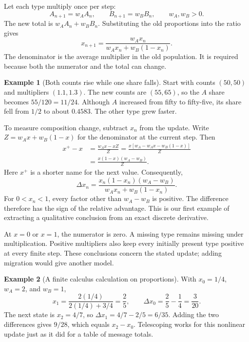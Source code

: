 \documentclass[11pt,oneside,openany]{book}
\theoremstyle{definition}
\newtheorem{example}{Example}[chapter]
\theoremstyle{remark}
\numberwithin{equation}{chapter}
\begin{document}
Let each type multiply once per step: \[A_{n+1}=w_AA_n,\qquad B_{n+1}=w_BB_n,\qquad w_A,w_B>0.\] The new total is \(w_AA_n+w_BB_n\). Substituting the old proportions into the ratio gives \[\boxed{x_{n+1}=\frac{w_Ax_n}{w_Ax_n+w_B(1-x_n)}.}\] The denominator is the average multiplier in the old population. It is required because both the numerator and the total can change.

\begin{example}[Both counts rise while one share falls]

Start with counts \((50,50)\) and multipliers \((1.1,1.3)\). The new counts are \((55,65)\), so the \(A\) share becomes \(55/120=11/24\). Although \(A\) increased from fifty to fifty-five, its share fell from \(1/2\) to about \(0.4583\). The other type grew faster.

\end{example}

To measure composition change, subtract \(x_n\) from the update. Write \(Z=w_Ax+w_B(1-x)\) for the denominator at the current step. Then \[\begin{aligned}
x^+-x&=\frac{w_Ax-xZ}{Z}
=\frac{x[w_A-w_Ax-w_B(1-x)]}{Z}\\
&=\frac{x(1-x)(w_A-w_B)}{Z}.
\end{aligned}\] Here \(x^+\) is a shorter name for the next value. Consequently, \[\boxed{\Delta x_n=\frac{x_n(1-x_n)(w_A-w_B)}{w_Ax_n+w_B(1-x_n)}.}\] For \(0<x_n<1\), every factor other than \(w_A-w_B\) is positive. The difference therefore has the sign of the relative advantage. This is our first example of extracting a qualitative conclusion from an exact discrete derivative.

At \(x=0\) or \(x=1\), the numerator is zero. A missing type remains missing under multiplication. Positive multipliers also keep every initially present type positive at every finite step. These conclusions concern the stated update; adding migration would give another model.

\begin{example}[A finite calculus calculation on proportions]

With \(x_0=1/4\), \(w_A=2\), and \(w_B=1\), \[x_1=\frac{2(1/4)}{2(1/4)+3/4}=\frac25,\qquad
\Delta x_0=\frac25-\frac14=\frac3{20}.\] The next state is \(x_2=4/7\), so \(\Delta x_1=4/7-2/5=6/35\). Adding the two differences gives \(9/28\), which equals \(x_2-x_0\). Telescoping works for this nonlinear update just as it did for a table of message totals.

\end{example}
\end{document}
